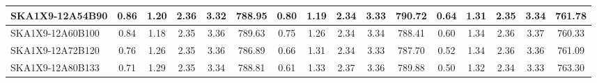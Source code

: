 \begin{table}[H]
{{\begin{tabular}{|lccccc||ccccc||ccccc|}
SKA1X9-12A54B90 & 0.86 \cellcolor{blue!60.00} & 1.20 \cellcolor{red!23.77} & 2.36 \cellcolor{green!60.00} & 3.32 \cellcolor{orange!18.00} & 788.95 \cellcolor{purple!26.32} & 0.80 \cellcolor{blue!60.00} & 1.19 \cellcolor{red!18.00} & 2.34 \cellcolor{green!18.00} & 3.33 \cellcolor{orange!18.00} & 790.72 \cellcolor{purple!60.00} & 0.64 \cellcolor{blue!60.00} & 1.31 \cellcolor{red!18.00} & 2.35 \cellcolor{green!20.90} & 3.34 \cellcolor{orange!24.85} & 761.78 \cellcolor{purple!44.41}\\ \hline 
SKA1X9-12A60B100 & 0.84 \cellcolor{blue!55.85} & 1.18 \cellcolor{red!18.00} & 2.35 \cellcolor{green!39.48} & 3.36 \cellcolor{orange!48.37} & 789.63 \cellcolor{purple!29.05} & 0.75 \cellcolor{blue!48.82} & 1.26 \cellcolor{red!38.80} & 2.34 \cellcolor{green!24.93} & 3.34 \cellcolor{orange!19.87} & 788.41 \cellcolor{purple!27.83} & 0.60 \cellcolor{blue!46.34} & 1.34 \cellcolor{red!55.52} & 2.36 \cellcolor{green!58.31} & 3.37 \cellcolor{orange!60.00} & 760.33 \cellcolor{purple!29.63}\\ \hline 
SKA1X9-12A72B120 & 0.76 \cellcolor{blue!40.51} & 1.26 \cellcolor{red!40.49} & 2.35 \cellcolor{green!33.75} & 3.36 \cellcolor{orange!50.68} & 786.89 \cellcolor{purple!18.00} & 0.66 \cellcolor{blue!30.68} & 1.31 \cellcolor{red!53.90} & 2.34 \cellcolor{green!28.61} & 3.33 \cellcolor{orange!19.12} & 787.70 \cellcolor{purple!18.00} & 0.52 \cellcolor{blue!24.31} & 1.34 \cellcolor{red!60.00} & 2.36 \cellcolor{green!60.00} & 3.36 \cellcolor{orange!54.14} & 761.09 \cellcolor{purple!37.39}\\ \hline 
SKA1X9-12A80B133 & 0.71 \cellcolor{blue!29.63} & 1.29 \cellcolor{red!46.64} & 2.35 \cellcolor{green!30.89} & 3.34 \cellcolor{orange!31.29} & 788.81 \cellcolor{purple!25.73} & 0.61 \cellcolor{blue!20.31} & 1.33 \cellcolor{red!59.47} & 2.37 \cellcolor{green!60.00} & 3.36 \cellcolor{orange!60.00} & 789.88 \cellcolor{purple!48.31} & 0.50 \cellcolor{blue!18.00} & 1.32 \cellcolor{red!36.43} & 2.34 \cellcolor{green!18.00} & 3.33 \cellcolor{orange!18.00} & 763.30 \cellcolor{purple!60.00}\\ \hline 
\end{tabular}}
\vspace{-0.300000cm}
\hspace{1cm} 
}
\end{table}
